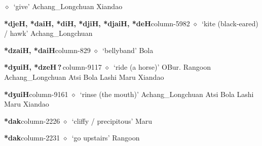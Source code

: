          $\diamond$~`give'
         Achang\_Longchuan 
\hspace{1ex}
         Xiandao 
  \item {\footnotesize \textbf{*djeH, *daiH, *diH, *djiH, *djaiH, *deH}}{\tiny column-5982}
         $\diamond$~`kite (black-eared) / hawk'
         Achang\_Longchuan 
  \item {\footnotesize \textbf{*dzaiH, *daiH}}{\tiny column-829}
         $\diamond$~`bellyband'
         Bola 
  \item {\footnotesize \textbf{*dʒuiH, *dzeH\,?\,}}{\tiny column-9117}
         $\diamond$~`ride (a horse)'
         OBur. 
\hspace{1ex}
         Rangoon 
\hspace{1ex}
         Achang\_Longchuan 
\hspace{1ex}
         Atsi 
\hspace{1ex}
         Bola 
\hspace{1ex}
         Lashi 
\hspace{1ex}
         Maru 
\hspace{1ex}
         Xiandao 
  \item {\footnotesize \textbf{*dʒuiH}}{\tiny column-9161}
         $\diamond$~`rinse (the mouth)'
         Achang\_Longchuan 
\hspace{1ex}
         Atsi 
\hspace{1ex}
         Bola 
\hspace{1ex}
         Lashi 
\hspace{1ex}
         Maru 
\hspace{1ex}
         Xiandao 
  \item {\footnotesize \textbf{*dak}}{\tiny column-2226}
         $\diamond$~`cliffy / precipitous'
         Maru 
  \item {\footnotesize \textbf{*dak}}{\tiny column-2231}
         $\diamond$~`go upstairs'
         Rangoon 
